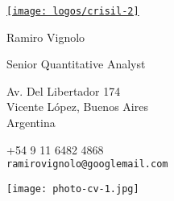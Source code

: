 \documentclass{article}
\begin{document}
\AddToShipoutPicture{\BackgroundPic}


\vspace{0.5cm plus \chico minus \chico}

\begin{minipage}{0.3\linewidth}




\end{minipage}
\begin{minipage}{0.4\linewidth}

\begin{center}
\href{http://www.crisil.com}{\texttt{[image: logos/crisil-2]}}\\

\smallskip

\textsf{Ramiro Vignolo}
\par
\textsf{Senior Quantitative Analyst}\\

\medskip

Av. Del Libertador 174\\
Vicente López, Buenos Aires\\
Argentina
\end{center}


\begin{center}
+54 9 11 6482 4868\\
\textcolor{azul}{\texttt{ramirovignolo@googlemail.com}}\\


\end{center}
\end{minipage}
\begin{minipage}{0.2\linewidth}
\begin{center}\texttt{[image: photo-cv-1.jpg]}\end{center}
\end{minipage}
\end{document}
